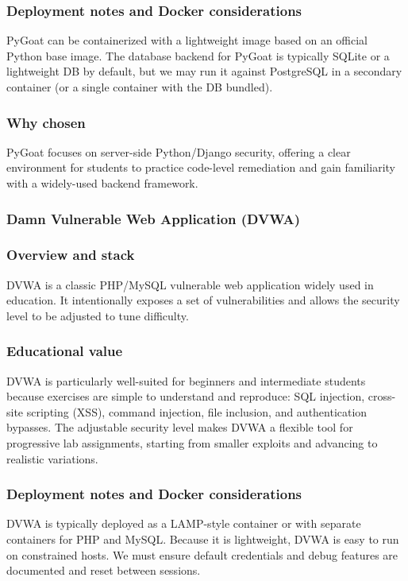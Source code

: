 \documentclass[12pt]{article}
\begin{document}
\subsubsection*{Deployment notes and Docker considerations}
PyGoat can be containerized with a lightweight image based on an official Python base image. The database backend for PyGoat is typically SQLite or a lightweight DB by default, but we may run it against PostgreSQL in a secondary container (or a single container with the DB bundled).

\subsubsection*{Why chosen}
PyGoat focuses on server-side Python/Django security, offering a clear environment for students to practice code-level remediation and gain familiarity with a widely-used backend framework.


\subsubsection{Damn Vulnerable Web Application (DVWA)}
\subsubsection*{Overview and stack}
DVWA is a classic PHP/MySQL vulnerable web application widely used in education. It intentionally exposes a set of vulnerabilities and allows the security level to be adjusted to tune difficulty.

\subsubsection*{Educational value}
DVWA is particularly well-suited for beginners and intermediate students because exercises are simple to understand and reproduce: SQL injection, cross-site scripting (XSS), command injection, file inclusion, and authentication bypasses. The adjustable security level makes DVWA a flexible tool for progressive lab assignments, starting from smaller exploits and advancing to realistic variations.

\subsubsection*{Deployment notes and Docker considerations}
DVWA is typically deployed as a LAMP-style container or with separate containers for PHP and MySQL. Because it is lightweight, DVWA is easy to run on constrained hosts. We must ensure default credentials and debug features are documented and reset between sessions.
\end{document}

